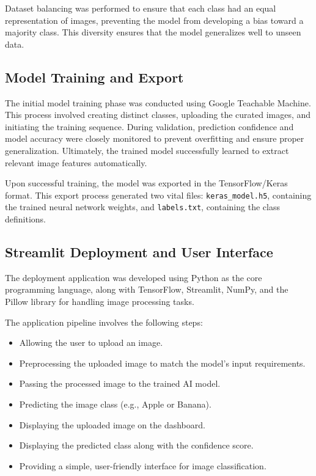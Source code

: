 Dataset balancing was performed to ensure that each class had an equal representation of images, preventing the model from developing a bias toward a majority class. This diversity ensures that the model generalizes well to unseen data.

\subsection{Model Training and Export}

The initial model training phase was conducted using Google Teachable Machine. This process involved creating distinct classes, uploading the curated images, and initiating the training sequence. During validation, prediction confidence and model accuracy were closely monitored to prevent overfitting and ensure proper generalization. Ultimately, the trained model successfully learned to extract relevant image features automatically.

Upon successful training, the model was exported in the TensorFlow/Keras format. This export process generated two vital files: \texttt{keras\_model.h5}, containing the trained neural network weights, and \texttt{labels.txt}, containing the class definitions.

\subsection{Streamlit Deployment and User Interface}

The deployment application was developed using Python as the core programming language, along with TensorFlow, Streamlit, NumPy, and the Pillow library for handling image processing tasks.

The application pipeline involves the following steps:
\begin{itemize}[leftmargin=1.5cm]
    \item Allowing the user to upload an image.
    \item Preprocessing the uploaded image to match the model's input requirements.
    \item Passing the processed image to the trained AI model.
    \item Predicting the image class (e.g., Apple or Banana).
    \item Displaying the uploaded image on the dashboard.
    \item Displaying the predicted class along with the confidence score.
    \item Providing a simple, user-friendly interface for image classification.
\end{itemize}

